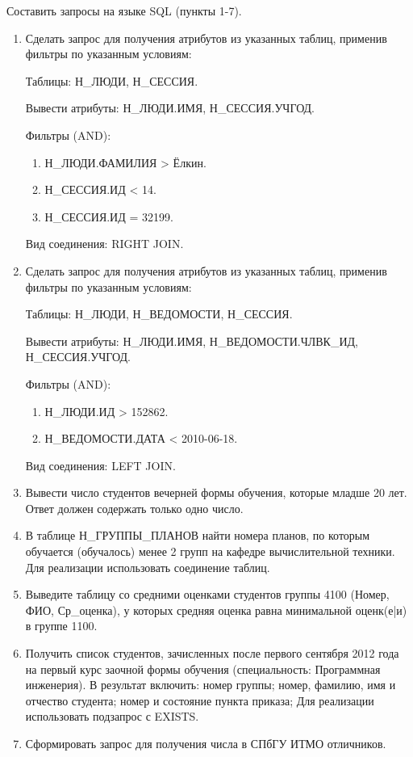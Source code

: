 Составить запросы на языке SQL (пункты 1-7).
\begin{enumerate}
	\item Сделать запрос для получения атрибутов из указанных таблиц, применив фильтры по указанным условиям:
	
	Таблицы: Н\_ЛЮДИ, Н\_СЕССИЯ.
	
	Вывести атрибуты: Н\_ЛЮДИ.ИМЯ, Н\_СЕССИЯ.УЧГОД.
	
	Фильтры (AND):
	\begin{enumerate}
		\item Н\_ЛЮДИ.ФАМИЛИЯ > Ёлкин.
		\item Н\_СЕССИЯ.ИД < 14.
		\item Н\_СЕССИЯ.ИД = 32199.
	\end{enumerate}
	Вид соединения: RIGHT JOIN.
	\item Сделать запрос для получения атрибутов из указанных таблиц, применив фильтры по указанным условиям:
	
	Таблицы: Н\_ЛЮДИ, Н\_ВЕДОМОСТИ, Н\_СЕССИЯ.
	
	Вывести атрибуты: Н\_ЛЮДИ.ИМЯ, Н\_ВЕДОМОСТИ.ЧЛВК\_ИД, Н\_СЕССИЯ.УЧГОД.
	
	Фильтры (AND):
	\begin{enumerate}
		\item Н\_ЛЮДИ.ИД > 152862.
		\item Н\_ВЕДОМОСТИ.ДАТА < 2010-06-18.
	\end{enumerate}
	Вид соединения: LEFT JOIN.
	\item Вывести число студентов вечерней формы обучения, которые младше 20 лет.
	Ответ должен содержать только одно число.
	\item В таблице Н\_ГРУППЫ\_ПЛАНОВ найти номера планов, по которым обучается (обучалось) менее 2 групп на кафедре вычислительной техники.
	Для реализации использовать соединение таблиц.
	\item Выведите таблицу со средними оценками студентов группы 4100 (Номер, ФИО, Ср\_оценка), у которых средняя оценка равна минимальной оценк(е|и) в группе 1100.
	\item Получить список студентов, зачисленных после первого сентября 2012 года на первый курс заочной формы обучения (специальность: Программная инженерия). В результат включить:
	номер группы;
	номер, фамилию, имя и отчество студента;
	номер и состояние пункта приказа;
	Для реализации использовать подзапрос с EXISTS.
	\item Сформировать запрос для получения числа в СПбГУ ИТМО отличников.
\end{enumerate}






